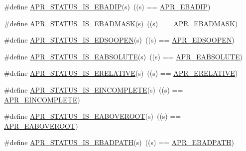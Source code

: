 \begin{DoxyCompactItemize}
\item 
\#define \mbox{\hyperlink{group___a_p_r___s_t_a_t_u_s___i_s_ga02d9309a113e07050308af66e955d600}{A\+P\+R\+\_\+\+S\+T\+A\+T\+U\+S\+\_\+\+I\+S\+\_\+\+E\+B\+A\+D\+IP}}(s)~((s) == \mbox{\hyperlink{group___a_p_r___error_ga96180fb8075ae0150bfed50c2e7f7a59}{A\+P\+R\+\_\+\+E\+B\+A\+D\+IP}})
\item 
\#define \mbox{\hyperlink{group___a_p_r___s_t_a_t_u_s___i_s_gabec95c93d0c5996f14a94e2cc37e1904}{A\+P\+R\+\_\+\+S\+T\+A\+T\+U\+S\+\_\+\+I\+S\+\_\+\+E\+B\+A\+D\+M\+A\+SK}}(s)~((s) == \mbox{\hyperlink{group___a_p_r___error_ga5249b5edc27466f6b60b3dfa1541ba31}{A\+P\+R\+\_\+\+E\+B\+A\+D\+M\+A\+SK}})
\item 
\#define \mbox{\hyperlink{group___a_p_r___s_t_a_t_u_s___i_s_gae87f4877aa35535eb3546b499ef9d9f3}{A\+P\+R\+\_\+\+S\+T\+A\+T\+U\+S\+\_\+\+I\+S\+\_\+\+E\+D\+S\+O\+O\+P\+EN}}(s)~((s) == \mbox{\hyperlink{group___a_p_r___error_gac96fbde76282364e8c482d6f23bc61bb}{A\+P\+R\+\_\+\+E\+D\+S\+O\+O\+P\+EN}})
\item 
\#define \mbox{\hyperlink{group___a_p_r___s_t_a_t_u_s___i_s_gae662804298416a68e63c4f84f245d30c}{A\+P\+R\+\_\+\+S\+T\+A\+T\+U\+S\+\_\+\+I\+S\+\_\+\+E\+A\+B\+S\+O\+L\+U\+TE}}(s)~((s) == \mbox{\hyperlink{group___a_p_r___error_gafd1ffc5bf2bf215ad048780408913d0e}{A\+P\+R\+\_\+\+E\+A\+B\+S\+O\+L\+U\+TE}})
\item 
\#define \mbox{\hyperlink{group___a_p_r___s_t_a_t_u_s___i_s_ga7a8fca5102890e9a0bc4133ba848d52c}{A\+P\+R\+\_\+\+S\+T\+A\+T\+U\+S\+\_\+\+I\+S\+\_\+\+E\+R\+E\+L\+A\+T\+I\+VE}}(s)~((s) == \mbox{\hyperlink{group___a_p_r___error_gae4688dfa866265b9ec3623689c23923b}{A\+P\+R\+\_\+\+E\+R\+E\+L\+A\+T\+I\+VE}})
\item 
\#define \mbox{\hyperlink{group___a_p_r___s_t_a_t_u_s___i_s_gae7354f40a912dc43fe76ba2a59de0403}{A\+P\+R\+\_\+\+S\+T\+A\+T\+U\+S\+\_\+\+I\+S\+\_\+\+E\+I\+N\+C\+O\+M\+P\+L\+E\+TE}}(s)~((s) == \mbox{\hyperlink{group___a_p_r___error_gab4357bcbdc2922183e0594865b59ce58}{A\+P\+R\+\_\+\+E\+I\+N\+C\+O\+M\+P\+L\+E\+TE}})
\item 
\#define \mbox{\hyperlink{group___a_p_r___s_t_a_t_u_s___i_s_gae89b8de1e40b855cf95987ce5947b442}{A\+P\+R\+\_\+\+S\+T\+A\+T\+U\+S\+\_\+\+I\+S\+\_\+\+E\+A\+B\+O\+V\+E\+R\+O\+OT}}(s)~((s) == \mbox{\hyperlink{group___a_p_r___error_ga4828cc04f97dc7bed691456adf7c073e}{A\+P\+R\+\_\+\+E\+A\+B\+O\+V\+E\+R\+O\+OT}})
\item 
\#define \mbox{\hyperlink{group___a_p_r___s_t_a_t_u_s___i_s_ga0758d7227209e4311c843c752c0dd075}{A\+P\+R\+\_\+\+S\+T\+A\+T\+U\+S\+\_\+\+I\+S\+\_\+\+E\+B\+A\+D\+P\+A\+TH}}(s)~((s) == \mbox{\hyperlink{group___a_p_r___error_ga1731292eb3e3cdc801d3bf0b09cd8da7}{A\+P\+R\+\_\+\+E\+B\+A\+D\+P\+A\+TH}})

\end{DoxyCompactItemize}
